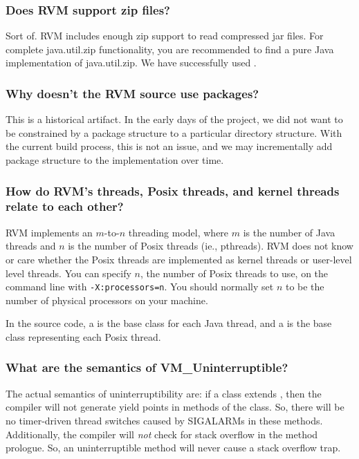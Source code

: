 \subsubsection{Does RVM support zip files?}

Sort of.  RVM includes enough zip support to read compressed jar files.
For complete java.util.zip functionality, you are recommended to find 
a pure Java implementation of java.util.zip.  We have successfully used
. 

\subsubsection{Why doesn't the RVM source use packages?}

This is a historical artifact.  In the early days of the project, we did
not want to be constrained by a package structure to a particular
directory structure.  With the current build process, this is not an
issue, and we may incrementally add package structure to the
implementation over time.

\subsubsection{How do RVM's threads, Posix threads, and kernel
threads relate to each other?}

RVM implements an $m$-to-$n$ threading model, where $m$ is the number of 
Java threads and $n$ is the number of Posix threads (ie., pthreads).  RVM
does not know or care whether the Posix threads are implemented as kernel
threads or user-level level threads.  You can specify $n$, the number of
Posix threads to use, on the command line with {\tt -X:processors=n}.
You should normally set $n$ to be the number of physical processors on
your machine.  

In the source code, a 
is the base class for each Java
thread, and a 
is the base class representing each
Posix thread.  

\subsubsection{What are the semantics of VM\_Uninterruptible?}

The actual semantics of uninterruptibility are: if a class 
extends 
, then the compiler will not
generate yield points in methods of the class.  So, there will be no
timer-driven thread switches caused by SIGALARMs in these methods.
Additionally, the compiler will {\em not} check for stack overflow in the
method prologue.  So, an uninterruptible method will never cause a stack
overflow trap.  

